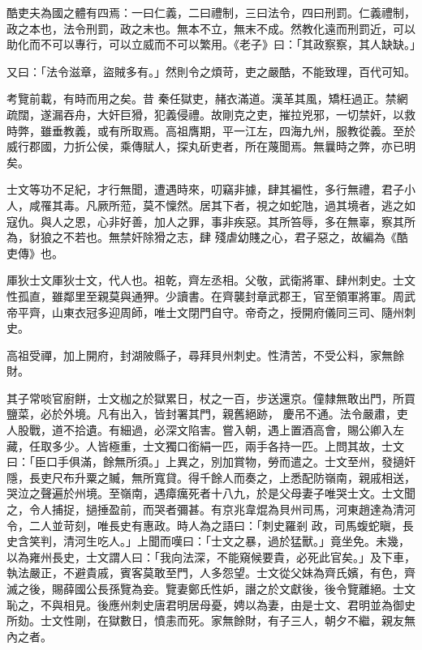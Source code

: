 
\begin{pinyinscope}

 酷吏夫為國之體有四焉：一曰仁義，二曰禮制，三曰法令，四曰刑罰。仁義禮制，政之本也，法令刑罰，政之末也。無本不立，無末不成。然教化遠而刑罰近，可以助化而不可以專行，可以立威而不可以繁用。《老子》曰：「其政察察，其人缺缺。」



 又曰：「法令滋章，盜賊多有。」然則令之煩苛，吏之嚴酷，不能致理，百代可知。



 考覽前載，有時而用之矣。昔
 秦任獄吏，赭衣滿道。漢革其風，矯枉過正。禁網疏闊，遂漏吞舟，大奸巨猾，犯義侵禮。故剛克之吏，摧拉兇邪，一切禁奸，以救時弊，雖垂教義，或有所取焉。高祖膺期，平一江左，四海九州，服教從義。至於威行郡國，力折公侯，乘傳賦人，探丸斫吏者，所在蔑聞焉。無曩時之弊，亦已明矣。



 士文等功不足紀，才行無聞，遭遇時來，叨竊非據，肆其褊性，多行無禮，君子小人，咸罹其毒。凡厥所蒞，莫不懍然。居其下者，視之如蛇虺，過其境者，逃之如寇仇。與人之恩，心非好善，加人之罪，事非疾惡。其所笞辱，多在無辜，察其所為，豺狼之不若也。無禁奸除猾之志，肆
 殘虐幼賤之心，君子惡之，故編為《酷吏傳》也。



 厙狄士文厙狄士文，代人也。祖乾，齊左丞相。父敬，武衛將軍、肆州刺史。士文性孤直，雖鄰里至親莫與通狎。少讀書。在齊襲封章武郡王，官至領軍將軍。周武帝平齊，山東衣冠多迎周師，唯士文閉門自守。帝奇之，授開府儀同三司、隨州刺史。



 高祖受禪，加上開府，封湖陂縣子，尋拜貝州刺史。性清苦，不受公料，家無餘財。



 其子常啖官廚餅，士文枷之於獄累日，杖之一百，步送還京。僮隸無敢出門，所買鹽菜，必於外境。凡有出入，皆封署其門，親舊絕跡，
 慶吊不通。法令嚴肅，吏人股戰，道不拾遺。有細過，必深文陷害。嘗入朝，遇上置酒高會，賜公卿入左藏，任取多少。人皆極重，士文獨口銜絹一匹，兩手各持一匹。上問其故，士文曰：「臣口手俱滿，餘無所須。」上異之，別加賞物，勞而遣之。士文至州，發擿奸隱，長吏尺布升粟之贓，無所寬貸。得千餘人而奏之，上悉配防嶺南，親戚相送，哭泣之聲遍於州境。至嶺南，遇瘴癘死者十八九，於是父母妻子唯哭士文。士文聞之，令人捕捉，撾捶盈前，而哭者彌甚。有京兆韋焜為貝州司馬，河東趙達為清河令，二人並苛刻，唯長史有惠政。時人為之語曰：「刺史羅剎
 政，司馬蝮蛇瞋，長史含笑判，清河生吃人。」上聞而嘆曰：「士文之暴，過於猛獸。」竟坐免。未幾，以為雍州長史，士文謂人曰：「我向法深，不能窺候要貴，必死此官矣。」及下車，執法嚴正，不避貴戚，賓客莫敢至門，人多怨望。士文從父妹為齊氏嬪，有色，齊滅之後，賜薛國公長孫覽為妾。覽妻鄭氏性妒，譖之於文獻後，後令覽離絕。士文恥之，不與相見。後應州刺史唐君明居母憂，娉以為妻，由是士文、君明並為御史所劾。士文性剛，在獄數日，憤恚而死。家無餘財，有子三人，朝夕不繼，親友無內之者。




\end{pinyinscope}
